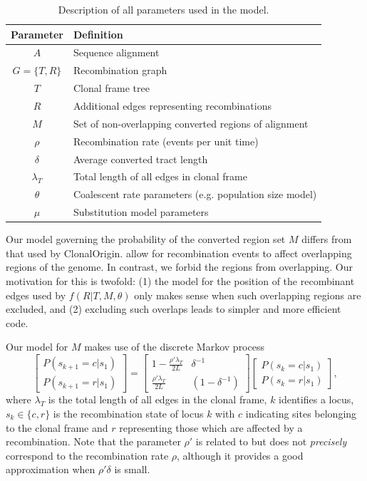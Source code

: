 \documentclass[a4paper,10pt]{article}
\begin{document}
\begin{table}[t]
\begin{tabular}{|cl|}
  \hline
  Parameter & Definition \\
  \hline
  $A$ & Sequence alignment \\
  $G=\{T,R\}$ & Recombination graph \\
  $T$ & Clonal frame tree \\
  $R$ & Additional edges representing recombinations \\
  $M$ & Set of non-overlapping converted regions of alignment \\
  $\rho$ & Recombination rate (events per unit time) \\
  $\delta$ & Average converted tract length \\
  $\lambda_T$ & Total length of all edges in clonal frame \\
  $\theta$ & Coalescent rate parameters (e.g. population size model) \\
  $\mu$ & Substitution model parameters \\
  \hline
\end{tabular}
\caption{Description of all parameters used in the model.}
\end{table}


Our model governing the probability of the converted region set $M$
differs from that used by ClonalOrigin. \cite{Didelot2010} allow for
recombination events to affect overlapping regions of the genome.  In
contrast, we forbid the regions from overlapping. Our motivation for
this is twofold: (1) the model for the position of the recombinant edges used
by $f(R|T,M,\theta)$ only makes sense when such overlapping regions
are excluded, and (2) excluding such overlaps leads to simpler and
more efficient code.

Our model for $M$ makes use of the discrete Markov process
\begin{equation}
\begin{bmatrix}
P(s_{k+1}=c|s_1) \\
P(s_{k+1}=r|s_1)
\end{bmatrix}
=
\begin{bmatrix}
1-\frac{\rho' \lambda_T}{2L} & \delta^{-1} \\
\frac{\rho' \lambda_T}{2L} & (1-\delta^{-1})
\end{bmatrix}
\begin{bmatrix}
P(s_{k}=c|s_1) \\
P(s_{k}=r|s_1)
\end{bmatrix},
\end{equation}
where $\lambda_T$ is the total length of all edges in the clonal
frame, $k$ identifies a locus, $s_k\in\{c,r\}$ is the recombination
state of locus $k$ with $c$ indicating sites belonging to the clonal
frame and $r$ representing those which are affected by a
recombination.  Note that the parameter $\rho'$ is related to but does
not \emph{precisely} correspond to the recombination rate $\rho$,
although it provides a good approximation when $\rho'\delta$ is small.
\end{document}
